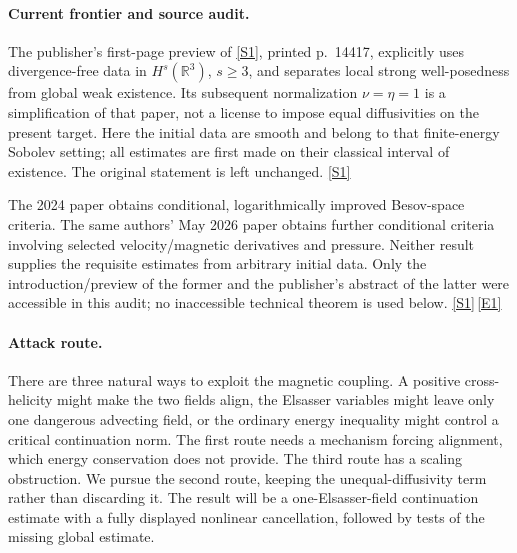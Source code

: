 \documentclass[11pt,a4paper]{article}
\newcommand{\R}{\mathbb{R}}
\newcommand{\sref}[2]{\hyperlink{source:#1:#2}{[S#2]}}
\newcommand{\eref}[2]{\hyperlink{extra:#1:#2}{[E#2]}}
\numberwithin{equation}{section}
\begin{document}
\paragraph{Current frontier and source audit.}
The publisher's first-page preview of \sref{30006732}{1}, printed p.~14417,
explicitly uses divergence-free data in $H^s(\R^3)$, $s\geq3$, and separates
local strong well-posedness from global weak existence. Its subsequent
normalization $\nu=\eta=1$ is a simplification of that paper, not a license
to impose equal diffusivities on the present target. Here the initial data
are smooth and belong to that finite-energy Sobolev setting; all estimates
are first made on their classical interval of existence. The original
statement is left unchanged. \sref{30006732}{1}

The 2024 paper obtains conditional, logarithmically improved Besov-space
criteria. The same authors' May 2026 paper obtains further conditional
criteria involving selected velocity/magnetic derivatives and pressure.
Neither result supplies the requisite estimates from arbitrary initial
data. Only the introduction/preview of the former and the publisher's
abstract of the latter were accessible in this audit; no inaccessible
technical theorem is used below. \sref{30006732}{1}\,\eref{30006732}{1}

\paragraph{Attack route.}
There are three natural ways to exploit the magnetic coupling. A positive
cross-helicity might make the two fields align, the Elsasser variables might
leave only one dangerous advecting field, or the ordinary energy inequality
might control a critical continuation norm. The first route needs a
mechanism forcing alignment, which energy conservation does not provide.
The third route has a scaling obstruction. We pursue the second route,
keeping the unequal-diffusivity term rather than discarding it. The result
will be a one-Elsasser-field continuation estimate with a fully displayed
nonlinear cancellation, followed by tests of the missing global estimate.
\end{document}
